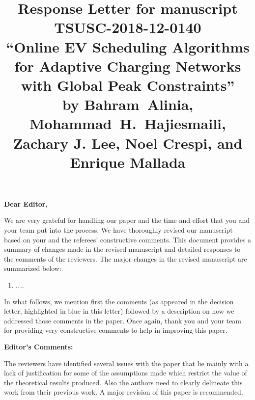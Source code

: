 \documentclass[11pt]{article}
\begin{document}
\title{Response Letter for manuscript TSUSC-2018-12-0140 \\ ``Online EV Scheduling Algorithms for Adaptive Charging Networks with Global Peak Constraints'' \\
	\vspace{4mm} \large
	by  Bahram~Alinia, Mohammad~H.~Hajiesmaili, Zachary J. Lee, Noel Crespi, and Enrique Mallada
}

\maketitle

\textbf{Dear Editor,}

We are very grateful for handling our paper and the time and effort that you and your team put into the process. We have thoroughly revised our manuscript based on your and the referees' constructive comments. This document provides a summary of changes made in the revised manuscript and detailed responses to the comments of the reviewers. The major changes in the revised manuscript are summarized below:

\begin{enumerate}
\item \textit{...}. 


\end{enumerate}


In what follows, we mention first the comments (as appeared in the decision letter, highlighted in {\color{blue} blue} in this letter) followed by a description on how we addressed those comments in the paper. Once again, thank you and your team for providing very constructive comments to help in improving this paper.



\newpage

{\Large\textbf{Editor's Comments:}}
\vspace{3mm}

{\color{blue}The reviewers have identified several issues with the paper that lie mainly with a lack of justification for some of the assumptions made which restrict the value of the theoretical results produced. Also the authors need to clearly delineate this work from their previous work. A major revision of this paper is recommended.}
\end{document}
